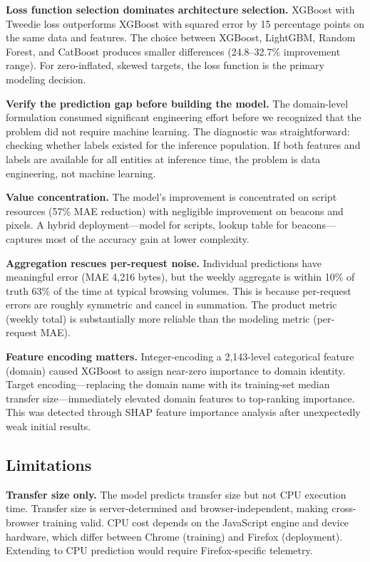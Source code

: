 \documentclass[11pt]{article}
\begin{document}
\textbf{Loss function selection dominates architecture selection.} XGBoost with Tweedie loss outperforms XGBoost with squared error by 15 percentage points on the same data and features. The choice between XGBoost, LightGBM, Random Forest, and CatBoost produces smaller differences (24.8--32.7\% improvement range). For zero-inflated, skewed targets, the loss function is the primary modeling decision.

\textbf{Verify the prediction gap before building the model.} The domain-level formulation consumed significant engineering effort before we recognized that the problem did not require machine learning. The diagnostic was straightforward: checking whether labels existed for the inference population. If both features and labels are available for all entities at inference time, the problem is data engineering, not machine learning.

\textbf{Value concentration.} The model's improvement is concentrated on script resources (57\% MAE reduction) with negligible improvement on beacons and pixels. A hybrid deployment---model for scripts, lookup table for beacons---captures most of the accuracy gain at lower complexity.

\textbf{Aggregation rescues per-request noise.} Individual predictions have meaningful error (MAE 4,216 bytes), but the weekly aggregate is within 10\% of truth 63\% of the time at typical browsing volumes. This is because per-request errors are roughly symmetric and cancel in summation. The product metric (weekly total) is substantially more reliable than the modeling metric (per-request MAE).

\textbf{Feature encoding matters.} Integer-encoding a 2,143-level categorical feature (domain) caused XGBoost to assign near-zero importance to domain identity. Target encoding---replacing the domain name with its training-set median transfer size---immediately elevated domain features to top-ranking importance. This was detected through SHAP feature importance analysis after unexpectedly weak initial results.

\subsection{Limitations}

\textbf{Transfer size only.} The model predicts transfer size but not CPU execution time. Transfer size is server-determined and browser-independent, making cross-browser training valid. CPU cost depends on the JavaScript engine and device hardware, which differ between Chrome (training) and Firefox (deployment). Extending to CPU prediction would require Firefox-specific telemetry.
\end{document}
